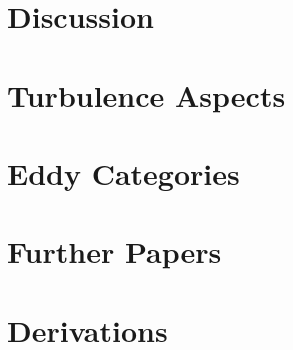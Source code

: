 	\chapter{Discussion}
	\appendix
	\renewcommand{\thechapter}{\Alph{chapter}}
	\begin{appendices}
	\pagestyle{fancy}
	\chapter{Turbulence Aspects}
		
	\chapter{Eddy Categories}
		
	\chapter{Further Papers}
		
	\chapter{Derivations}
		
	\end{appendices}
	
	
	\listoftodos
	

